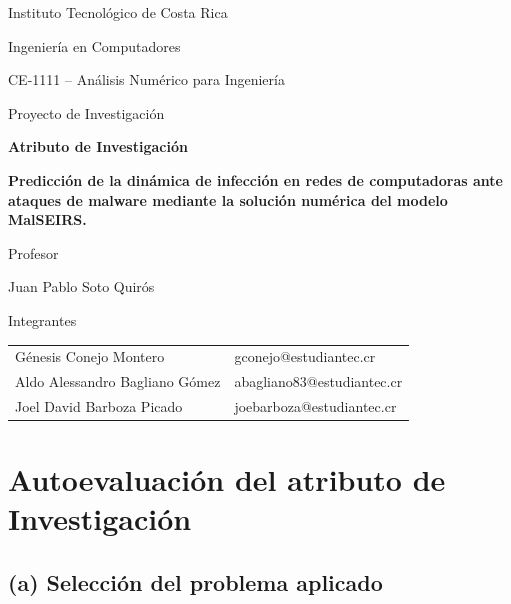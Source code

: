 \documentclass[11pt,a4paper]{article}
\begin{document}
\hypersetup{pageanchor=false}
\begin{titlepage}
    \centering
    \vspace*{0.4cm}
    {\large Instituto Tecnológico de Costa Rica\par}
    \vspace{1.5cm}
    {\large Ingeniería en Computadores\par}
    \vspace{1.5cm}
    {\large CE-1111 -- Análisis Numérico para Ingeniería\par}
    \vspace{0.3cm}
    {\large Proyecto de Investigación\par}
    \vspace{0.9cm}
    {\Large\bfseries Atributo de Investigación\par}
    \vspace{0.6cm}
    {\large\bfseries Predicción de la dinámica de infección en redes de
    computadoras ante ataques de malware mediante la solución numérica
    del modelo MalSEIRS.\par}
    \vspace{1.5cm}
    {\large Profesor\par}
    \vspace{0.3cm}
    {\large Juan Pablo Soto Quirós\par}
    \vfill
    {\large Integrantes\par}
    \vspace{0.3cm}
    \begin{tabular}{l@{\quad|\quad}l}
        Génesis Conejo Montero & gconejo@estudiantec.cr\\[5pt]
        Aldo Alessandro Bagliano Gómez & abagliano83@estudiantec.cr\\[5pt]
        Joel David Barboza Picado & joebarboza@estudiantec.cr
    \end{tabular}
    \vspace*{1.7cm}
\end{titlepage}
\hypersetup{pageanchor=true}

\section*{Autoevaluación del atributo de Investigación}

\subsection*{(a) Selección del problema aplicado}
\end{document}
